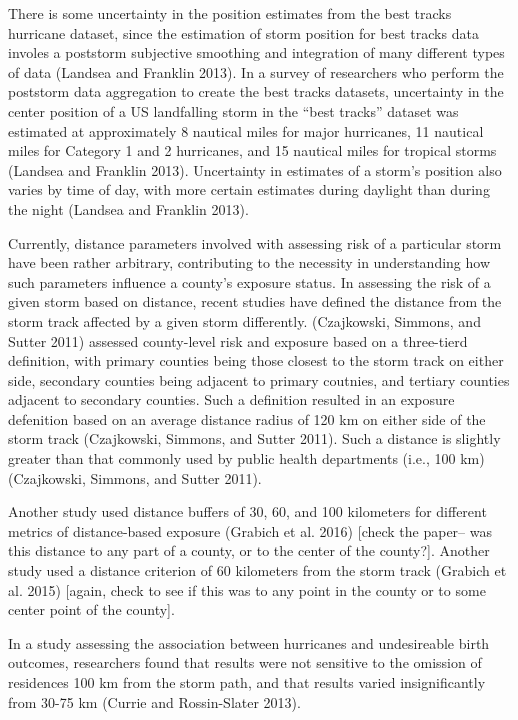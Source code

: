 \documentclass[]{elsarticle} %
\begin{document}
There is some uncertainty in the position estimates from the best tracks
hurricane dataset, since the estimation of storm position for best
tracks data involes a poststorm subjective smoothing and integration of
many different types of data (Landsea and Franklin 2013). In a survey of
researchers who perform the poststorm data aggregation to create the
best tracks datasets, uncertainty in the center position of a US
landfalling storm in the ``best tracks'' dataset was estimated at
approximately 8 nautical miles for major hurricanes, 11 nautical miles
for Category 1 and 2 hurricanes, and 15 nautical miles for tropical
storms (Landsea and Franklin 2013). Uncertainty in estimates of a
storm's position also varies by time of day, with more certain estimates
during daylight than during the night (Landsea and Franklin 2013).

Currently, distance parameters involved with assessing risk of a
particular storm have been rather arbitrary, contributing to the
necessity in understanding how such parameters influence a county's
exposure status. In assessing the risk of a given storm based on
distance, recent studies have defined the distance from the storm track
affected by a given storm differently. (Czajkowski, Simmons, and Sutter
2011) assessed county-level risk and exposure based on a three-tierd
definition, with primary counties being those closest to the storm track
on either side, secondary counties being adjacent to primary coutnies,
and tertiary counties adjacent to secondary counties. Such a definition
resulted in an exposure defenition based on an average distance radius
of 120 km on either side of the storm track (Czajkowski, Simmons, and
Sutter 2011). Such a distance is slightly greater than that commonly
used by public health departments (i.e., 100 km) (Czajkowski, Simmons,
and Sutter 2011).

Another study used distance buffers of 30, 60, and 100 kilometers for
different metrics of distance-based exposure (Grabich et al. 2016)
{[}check the paper-- was this distance to any part of a county, or to
the center of the county?{]}. Another study used a distance criterion of
60 kilometers from the storm track (Grabich et al. 2015) {[}again, check
to see if this was to any point in the county or to some center point of
the county{]}.

In a study assessing the association between hurricanes and undesireable
birth outcomes, researchers found that results were not sensitive to the
omission of residences 100 km from the storm path, and that results
varied insignificantly from 30-75 km (Currie and Rossin-Slater 2013).
\end{document}
